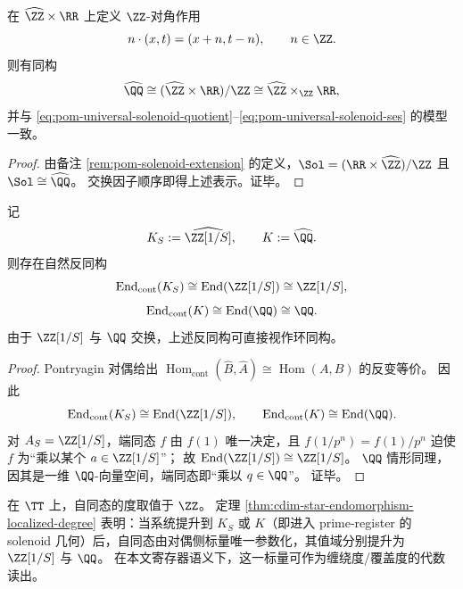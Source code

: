 \begin{proposition}\label{prop:cdim-star-universal-solenoid-fiber-model}
在 \(\widehat{\ZZ}\times \RR\) 上定义 \(\ZZ\)-对角作用
\[
n\cdot(x,t)=(x+n,t-n),\qquad n\in\ZZ.
\]
则有同构
\[
\widehat{\QQ}\cong (\widehat{\ZZ}\times \RR)/\ZZ
\cong \widehat{\ZZ}\times_{\ZZ}\RR,
\]
并与 \eqref{eq:pom-universal-solenoid-quotient}--\eqref{eq:pom-universal-solenoid-ses} 的模型一致。
\end{proposition}
\begin{proof}
由备注 \ref{rem:pom-solenoid-extension} 的定义，\(\Sol=(\RR\times\widehat{\ZZ})/\ZZ\) 且 \(\Sol\cong\widehat{\QQ}\)。
交换因子顺序即得上述表示。证毕。
\end{proof}

\begin{theorem}[局部化与有理化的自同态度值域]\label{thm:cdim-star-endomorphism-localized-degree}
记
\[
K_S:=\widehat{\ZZ[1/S]},\qquad K:=\widehat{\QQ}.
\]
则存在自然反同构
\[
\operatorname{End}_{\mathrm{cont}}(K_S)\cong \operatorname{End}(\ZZ[1/S])\cong \ZZ[1/S],
\]
\[
\operatorname{End}_{\mathrm{cont}}(K)\cong \operatorname{End}(\QQ)\cong \QQ.
\]
由于 \(\ZZ[1/S]\) 与 \(\QQ\) 交换，上述反同构可直接视作环同构。
\end{theorem}
\begin{proof}
Pontryagin 对偶给出
\(
\operatorname{Hom}_{\mathrm{cont}}(\widehat B,\widehat A)\cong \operatorname{Hom}(A,B)
\)
的反变等价。
因此
\[
\operatorname{End}_{\mathrm{cont}}(K_S)\cong \operatorname{End}(\ZZ[1/S]),\qquad
\operatorname{End}_{\mathrm{cont}}(K)\cong \operatorname{End}(\QQ).
\]
对 \(A_S=\ZZ[1/S]\)，端同态 \(f\) 由 \(f(1)\) 唯一决定，且
\(
f(1/p^n)=f(1)/p^n
\)
迫使 \(f\) 为“乘以某个 \(a\in \ZZ[1/S]\)”；
故 \(\operatorname{End}(\ZZ[1/S])\cong \ZZ[1/S]\)。
\(\QQ\) 情形同理，因其是一维 \(\QQ\)-向量空间，端同态即“乘以 \(q\in\QQ\)”。
证毕。
\end{proof}

\begin{remark}\label{rem:cdim-star-winding-localization}
在 \(\TT\) 上，自同态的度取值于 \(\ZZ\)。
定理 \ref{thm:cdim-star-endomorphism-localized-degree} 表明：当系统提升到 \(K_S\) 或 \(K\)（即进入 prime-register 的 solenoid 几何）后，自同态由对偶侧标量唯一参数化，其值域分别提升为 \(\ZZ[1/S]\) 与 \(\QQ\)。
在本文寄存器语义下，这一标量可作为缠绕度/覆盖度的代数读出。
\end{remark}

